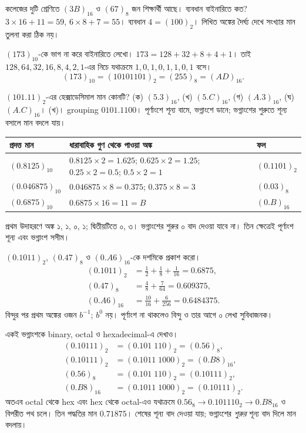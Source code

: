 কলেজের দুটি শ্রেণিতে $(3B)_{16}$ ও $(67)_8$ জন শিক্ষার্থী আছে। ব্যবধান বাইনারিতে কত?
\chThreeAnswer $3\times16+11=59$, $6\times8+7=55$। ব্যবধান $4=(100)_2$। লিখিত অঙ্কের দৈর্ঘ্য দেখে সংখ্যার মান তুলনা করা ঠিক নয়।

$(173)_{10}$-কে ভাগ না করে বাইনারিতে লেখো।
\chThreeAnswer $173=128+32+8+4+1$। তাই $128,64,32,16,8,4,2,1$-এর নিচে যথাক্রমে $1,0,1,0,1,1,0,1$ বসে।
\[(173)_{10}=(10101101)_2=(255)_8=(AD)_{16}.\]

$(101.11)_2$-এর হেক্সাডেসিমাল মান কোনটি? (ক) $(5.3)_{16}$, (খ) $(5.C)_{16}$, (গ) $(A.3)_{16}$, (ঘ) $(A.C)_{16}$।
\chThreeAnswer (খ)। grouping $0101.1100$। পূর্ণাংশে শূন্য বামে, ভগ্নাংশে ডানে; ভগ্নাংশের শুরুতে শূন্য বসালে মান বদলে যায়।

\chThreeAnswer
\begin{center}\begin{tabularx}{\linewidth}{|L{.23\linewidth}|Y|L{.27\linewidth}|}\hline
প্রদত্ত মান & ধারাবাহিক গুণ থেকে পাওয়া অঙ্ক & ফল\\\hline
$(0.8125)_{10}$ & $0.8125\times2=1.625$; $0.625\times2=1.25$; $0.25\times2=0.5$; $0.5\times2=1$ & $(0.1101)_2$\\\hline
$(0.046875)_{10}$ & $0.046875\times8=0.375$; $0.375\times8=3$ & $(0.03)_8$\\\hline
$(0.6875)_{10}$ & $0.6875\times16=11=B$ & $(0.B)_{16}$\\\hline
\end{tabularx}\end{center}
প্রথম উদাহরণে অঙ্ক ১, ১, ০, ১; দ্বিতীয়টিতে ০, ৩। ভগ্নাংশের শুরুর ০ বাদ দেওয়া যাবে না। তিন ক্ষেত্রেই পূর্ণাংশ শূন্য এবং ভগ্নাংশ সসীম।

$(0.1011)_2$, $(0.47)_8$ ও $(0.A6)_{16}$-কে দশমিকে প্রকাশ করো।
\chThreeAnswer
\[\begin{aligned}
(0.1011)_2&=\tfrac12+\tfrac18+\tfrac1{16}=0.6875,\\
(0.47)_8&=\tfrac48+\tfrac7{64}=0.609375,\\
(0.A6)_{16}&=\tfrac{10}{16}+\tfrac6{256}=0.6484375.
\end{aligned}\]
বিন্দুর পর প্রথম অঙ্কের ওজন $b^{-1}$; $b^0$ নয়। পূর্ণাংশ না থাকলেও বিন্দু ও তার আগে ০ লেখা সুবিধাজনক।

একই ভগ্নাংশকে binary, octal ও hexadecimal-এ দেখাও।
\chThreeAnswer
\[\begin{aligned}
(0.10111)_2&=(0.101\;110)_2=(0.56)_8,\\
(0.10111)_2&=(0.1011\;1000)_2=(0.B8)_{16},\\
(0.56)_8&=(0.101\;110)_2=(0.10111)_2,\\
(0.B8)_{16}&=(0.1011\;1000)_2=(0.10111)_2.
\end{aligned}\]
অতএব octal থেকে hex এবং hex থেকে octal-এও যথাক্রমে $0.56_8\to0.101110_2\to0.B8_{16}$ ও বিপরীত পথ চলে। তিন পদ্ধতির মান $0.71875$। শেষের শূন্য বাদ দেওয়া যায়; ভগ্নাংশের \emph{শুরুর} শূন্য বাদ দিলে মান বদলায়।

